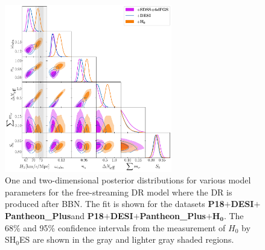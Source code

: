 \documentclass[aps,prd,twocolumn,notitlepage,
superscriptaddress,
nofootinbib,floatfix]{revtex4-2}
\newcommand{\planck}{\textbf{P18}}
\newcommand{\desi}{$\mathbf{+}$\textbf{DESI}}
\newcommand{\pantheon}{$\mathbf{+}${\bf Pantheon\_Plus}}
\newcommand{\shoes}{$\mathbf{+ H_0}$}
\begin{document}
\begin{widetext}
\begin{figure}[H]
\centering
    \includegraphics[width=0.65\textwidth]{figures_21_4/all_fsnb.pdf}
    \caption{One and two-dimensional posterior distributions for various model parameters for the free-streaming DR model where the DR is produced after BBN. The fit is shown for the datasets \planck\desi\pantheon and \planck\desi\pantheon\shoes. The 68\% and 95\% confidence intervals from the measurement of $H_0$ by SH$_0$ES are shown in the gray and lighter gray shaded regions.}
\end{figure}






\end{widetext}
\end{document}
